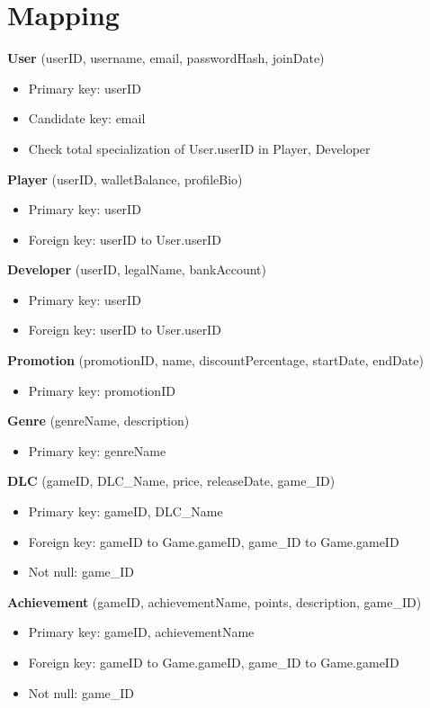\section{Mapping}

\noindent\textbf{User} (userID, username, email, passwordHash, joinDate)
\begin{itemize}[label=-]
    \item Primary key: userID
    \item Candidate key: email
    \item Check total specialization of User.userID in Player, Developer
\end{itemize}

\noindent\textbf{Player} (userID, walletBalance, profileBio)
\begin{itemize}[label=-]
    \item Primary key: userID
    \item Foreign key: userID to User.userID
\end{itemize}

\noindent\textbf{Developer} (userID, legalName, bankAccount)
\begin{itemize}[label=-]
    \item Primary key: userID
    \item Foreign key: userID to User.userID
\end{itemize}

\noindent\textbf{Promotion} (promotionID, name, discountPercentage, startDate, endDate)
\begin{itemize}[label=-]
    \item Primary key: promotionID
\end{itemize}

\noindent\textbf{Genre} (genreName, description) 
\begin{itemize}[label=-]
    \item Primary key: genreName
\end{itemize}


\noindent\textbf{DLC} (gameID, DLC\_Name, price, releaseDate, game\_ID)
\begin{itemize}[label=-]
    \item Primary key: gameID, DLC\_Name
    \item Foreign key: gameID to Game.gameID, game\_ID to Game.gameID
    \item Not null: game\_ID
\end{itemize}

\noindent\textbf{Achievement} (gameID, achievementName, points, description, game\_ID)
\begin{itemize}[label=-]
    \item Primary key: gameID, achievementName
    \item Foreign key: gameID to Game.gameID, game\_ID to Game.gameID
    \item Not null: game\_ID
\end{itemize}

